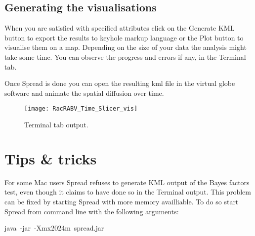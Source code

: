 \subsection{Generating the visualisations}

When you are satisfied with specified attributes click on the Generate
KML button to export the results to keyhole markup language or the
Plot button to visualise them on a map. Depending on the size of your
data the analysis might take some time. You can observe the progress
and errors if any, in the Terminal tab.

Once Spread is done you can open the resulting kml file in the virtual
globe software and animate the spatial diffusion over time.

\begin{figure}[H]
\begin{centering}
\texttt{[image: RacRABV\_Time\_Slicer\_vis]}
\caption{Terminal tab output.}
\label{fig:12}
\par\end{centering}
\end{figure}

\section{Tips \& tricks}

For some Mac users Spread refuses to generate KML output of the Bayes
factors test, even though it claims to have done so in the Terminal
output. This problem can be fixed by starting Spread with more memory
availliable. To do so start Spread from command line with the following
arguments: 

\begin{lyxcode}
java~-jar~-Xmx2024m~spread.jar
\end{lyxcode}
